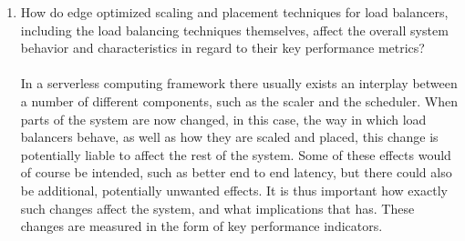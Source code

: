 \begin{enumerate}
        \item How do edge optimized scaling and placement techniques for load balancers, including the load balancing techniques themselves, affect the overall system behavior and characteristics in regard to their key performance metrics?\\\\
    In a serverless computing framework there usually exists an interplay between a number of different components, such as the scaler and the scheduler\cite{openfaas}\cite{kubernetes}. 
    When parts of the system are now changed, in this case, the way in which load balancers behave, as well as how they are scaled and placed, this change is potentially liable to affect the rest of the system. Some of these effects would of course be intended, such as better end to end latency, but there could also be additional, potentially unwanted effects. It is thus important how exactly such changes affect the system, and what implications that has. These changes are measured in the form of key performance indicators.
\end{enumerate}